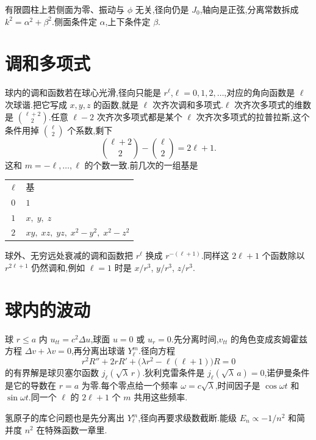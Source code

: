 有限圆柱上若侧面为零、振动与 $\phi$ 无关,径向仍是 $J_0$,轴向是正弦,分离常数拆成 $k^2=\alpha^2+\beta^2$.侧面条件定 $\alpha$,上下条件定 $\beta$.

\section{调和多项式}
球内的调和函数若在球心光滑,径向只能是 $r^{\ell}$,$\ell=0,1,2,\ldots$,对应的角向函数是 $\ell$ 次球谐.把它写成 $x,y,z$ 的函数,就是 $\ell$ 次齐次调和多项式.$\ell$ 次齐次多项式的维数是 $\binom{\ell+2}{2}$.任意 $\ell-2$ 次齐次多项式都是某个 $\ell$ 次齐次多项式的拉普拉斯,这个条件用掉 $\binom{\ell}{2}$ 个系数,剩下
\begin{equation}
  \binom{\ell+2}{2}-\binom{\ell}{2}=2\ell+1.
\end{equation}
这和 $m=-\ell,\ldots,\ell$ 的个数一致.前几次的一组基是
\begin{center}
\begin{tabular}{cl}
$\ell$ & 基 \\
$0$ & $1$ \\
$1$ & $x,\; y,\; z$ \\
$2$ & $xy,\; xz,\; yz,\; x^2-y^2,\; x^2-z^2$
\end{tabular}
\end{center}
球外、无穷远处衰减的调和函数把 $r^{\ell}$ 换成 $r^{-(\ell+1)}$.同样这 $2\ell+1$ 个函数除以 $r^{2\ell+1}$ 仍然调和,例如 $\ell=1$ 时是 $x/r^3$, $y/r^3$, $z/r^3$.

\section{球内的波动}
球 $r\leq a$ 内 $u_{tt}=c^2\Delta u$,球面 $u=0$ 或 $u_r=0$.先分离时间,$v_{tt}$ 的角色变成亥姆霍兹方程 $\Delta v+\lambda v=0$,再分离出球谐 $Y_{\ell}^{m}$.径向方程
\begin{equation}
  r^2 R''+2r R'+\bigl(\lambda r^2-\ell(\ell+1)\bigr)R=0
\end{equation}
的有界解是球贝塞尔函数 $j_{\ell}(\sqrt{\lambda}\,r)$.狄利克雷条件是 $j_{\ell}(\sqrt{\lambda}\,a)=0$,诺伊曼条件是它的导数在 $r=a$ 为零.每个零点给一个频率 $\omega=c\sqrt{\lambda}$,时间因子是 $\cos\omega t$ 和 $\sin\omega t$.同一个 $\ell$ 的 $2\ell+1$ 个 $m$ 共用这些频率.

氢原子的库仑问题也是先分离出 $Y_{\ell}^{m}$,径向再要求级数截断.能级 $E_n\propto -1/n^2$ 和简并度 $n^2$ 在特殊函数一章里.

